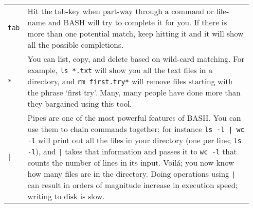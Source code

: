 \documentclass[12pt]{report}
\begin{document}
\begin{tabular}{l p{14cm}}
  \texttt{tab} & Hit the tab-key when part-way through a command or file-name and BASH will try to complete it for you. If there is more than one potential match, keep hitting it and it will show all the possible completions.\\
  \texttt{*} & You can list, copy, and delete based on wild-card matching. For example, \texttt{ls *.txt} will show you all the text files in a directory, and \texttt{rm first.try*} will remove files starting with the phrase `first try'. Many, many people have done more than they bargained using this tool.\\
  \texttt{|} & Pipes are one of the most powerful features of BASH. You can use them to chain commands together; for instance \texttt{ls -l | wc -l} will print out all the files in your directory (one per line; \texttt{ls -l}), and \texttt{|} takes that information and passes it to \texttt{wc -l} that counts the number of lines in its input. Voil\'{a}; you now know how many files are in the directory. Doing operations using \texttt{|} can result in orders of magnitude increase in execution speed; writing to disk is slow.\\
  \hline
  \end{tabular}
\end{document}
